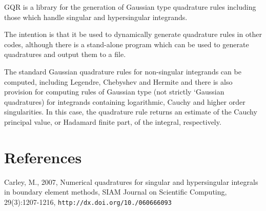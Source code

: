 G\+Q\+R is a library for the generation of Gaussian type quadrature rules including those which handle singular and hypersingular integrands.

The intention is that it be used to dynamically generate quadrature rules in other codes, although there is a stand-\/alone program which can be used to generate quadratures and output them to a file.

The standard Gaussian quadrature rules for non-\/singular integrands can be computed, including Legendre, Chebyshev and Hermite and there is also provision for computing rules of Gaussian type (not strictly `\+Gaussian quadratures\textquotesingle{}) for integrands containing logarithmic, Cauchy and higher order singularities. In this case, the quadrature rule returns an estimate of the Cauchy principal value, or Hadamard finite part, of the integral, respectively.\section{References}\label{index_references}

\begin{DoxyItemize}
\item Carley, M., 2007, Numerical quadratures for singular and hypersingular integrals in boundary element methods, S\+I\+A\+M Journal on Scientific Computing, 29(3)\+:1207-\/1216, {\tt http\+://dx.\+doi.\+org/10./060666093} 
\end{DoxyItemize}